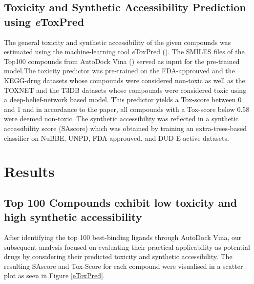 \documentclass[11pt, letterpaper, titlepage]{article}
\begin{document}
\subsection{Toxicity and Synthetic Accessibility Prediction using \textit{e}ToxPred}
The general toxicity and synthetic accessibility of the given compounds was estimated using the machine-learning tool \textit{e}ToxPred (\cite{pu2019toxpred}). The SMILES files of the Top100 compounds from AutoDock Vina (\cite{Trott.2010}) served as input for the pre-trained model.The toxicity predictor was pre-trained on the FDA-approuved and the KEGG-drug datasets whose compounds were considered non-toxic as well as the TOXNET and the T3DB datasets whose compounds were considered toxic using a deep-belief-network based model. This predictor yields a Tox-score between 0 and 1 and in accordance to the paper, all compounds with a Tox-score below 0.58 were deemed non-toxic. The synthetic accessibility was reflected in a synthetic accessibility score (SAscore) which was obtained by training an extra-trees-based classifier on NuBBE, UNPD, FDA-approuved, and DUD-E-active datasets.

\section{Results}
\subsection{Top 100 Compounds exhibit low toxicity and high synthetic accessibility}
After identifying the top 100 best-binding ligands through AutoDock Vina, our subsequent analysis focused on evaluating their practical applicability as potential drugs by considering their predicted toxicity and synthetic accessibility. The resulting SAscore and Tox-Score for each compound were visualised in a scatter plot as seen in {Figure \ref{eToxPred}}. 
\end{document}
